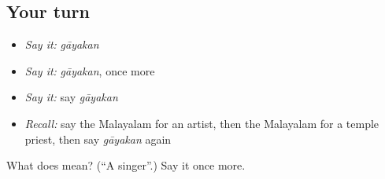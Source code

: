 \subsection*{Your turn}
\begin{itemize}
\raggedright
  \item \emph{Say it:} \emph{gāyakan}
  \item \emph{Say it:} \emph{gāyakan}, once more
  \item \emph{Say it:} say \emph{gāyakan}
  \item \emph{Recall:} say the Malayalam for an artist, then the Malayalam for a temple priest, then say \emph{gāyakan} again
\end{itemize}

\begin{tcolorbox}[breakable,colback=teal!4,colframe=teal!35!black,title={Before you move on}]
What does  mean? (\textquotedblleft{}A singer\textquotedblright{}.) Say it once more.
\end{tcolorbox}
